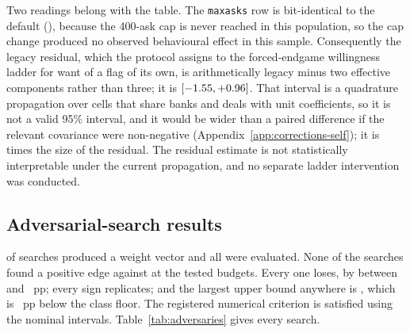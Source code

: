 \begin{table}[!ht]\centering
\caption{The rule-variant table: \sestina{}'s win-rate edge in percentage points against \fcheap{}
under each variant, both configurations playing the same variant in every row, with nominal 95\% intervals
as in \S\ref{sec:evaluation-intervals}. Per-bank values are given in bank order, 7090003 then
7090001. This is the first sweep of its kind in the corpus and has no training-bank counterpart.}
\label{tab:dialects}
{\tabfont}
\end{table}

Two readings belong with the table. The \texttt{maxasks} row is bit-identical to the default
(\vsevenMaxasksIdentical{}), because the 400-ask cap is never reached in this population, so the cap
change produced no observed behavioural effect in this sample. Consequently the legacy residual,
which the protocol assigns to the forced-endgame willingness ladder for want of a flag of its own,
is arithmetically legacy minus two effective components rather than three; it is
\vsevenLegacyResidual{} $[-1.55, +0.96]$. That interval is a
quadrature propagation over cells that share banks and deals with unit coefficients, so it is not a
valid 95\% interval, and it would be wider than a paired difference if the relevant covariance were
non-negative (Appendix~\ref{app:corrections-self}); it is \vsevenLegacyResidualRatio{} times the size of the
residual. The residual estimate is not statistically interpretable under the current propagation,
and no separate ladder intervention was conducted.

\subsection{Adversarial-search results}
\label{sec:results-adversarial}

\vsevenBfourFits{} of \vsevenBfourArmsWord{} searches produced a weight vector and all
\vsevenBfourArmsWord{} were evaluated. None of the \vsevenBfourArmsWord{} searches found a positive
edge against \sestina{} at the tested budgets. Every one loses, by between
\vsevenBfourBestLoss{} and \vsevenBfourWorstLoss{}~pp; every sign replicates; and the largest upper
bound anywhere is \vsevenBfourWorstUpper{}, which is \vsevenBfourFloorGap{}~pp below the class
floor. The registered numerical criterion is satisfied using the nominal intervals.
Table~\ref{tab:adversaries} gives every search.

\begin{table}[!ht]\centering
\caption{\vsevenBfourArms{} separately fitted adversarial searches against \sestina{}, run with
common cross-entropy-method fitting infrastructure (the \texttt{tune} driver) and differing in
objective, initialisation and search variance. Each row is the adversarial response win-rate edge
in percentage points: the fitted adversary's edge
against \sestina{}, so a positive value would mean the adversary beats the target. Each was fitted
on a deal stream disjoint from the banks it is evaluated on. Per-bank values are given in bank
order, 7090001 then 7090002.}
\label{tab:adversaries}
{\tabfont}
\end{table}


